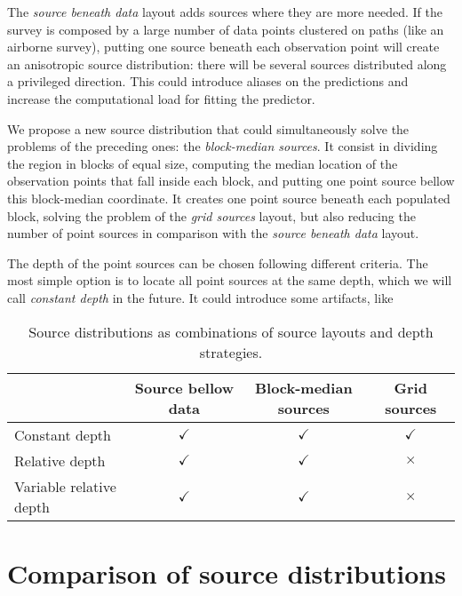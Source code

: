 \documentclass[twocolumn]{article}
\begin{document}
The \emph{source beneath data} layout adds sources where they are more needed.
If the survey is composed by a large number of data points clustered on paths
(like an airborne survey), putting one source beneath each observation point will create
an anisotropic source distribution: there will be several sources distributed along
a privileged direction.
This could introduce aliases on the predictions and increase the computational load for
fitting the predictor.

We propose a new source distribution that could simultaneously solve the problems of the
preceding ones: the \emph{block-median sources}.
It consist in dividing the region in blocks of equal size, computing the median location
of the observation points that fall inside each block, and putting one point source
bellow this block-median coordinate.
It creates one point source beneath each populated block, solving the problem of the
\emph{grid sources} layout, but also reducing the number of point sources in comparison
with the \emph{source beneath data} layout.

The depth of the point sources can be chosen following different criteria.
The most simple option is to locate all point sources at the same depth, which we will
call \emph{constant depth} in the future.
It could introduce some artifacts, like

\begin{table*}
    \begin{minipage}{80mm}
        \caption{
            Source distributions as combinations of source layouts and depth
            strategies.
        }
        \label{tab:source-distributions}
        \begin{tabular}{lccc}
            & Source bellow data & Block-median sources & Grid sources \\ \hline
            Constant depth          & $\checkmark$ & $\checkmark$ & $\checkmark$ \\
            Relative depth          & $\checkmark$ & $\checkmark$ & $\times$     \\
            Variable relative depth & $\checkmark$ & $\checkmark$ & $\times$     \\
        \end{tabular}
    \end{minipage}
\end{table*}



\section{Comparison of source distributions}
\end{document}
